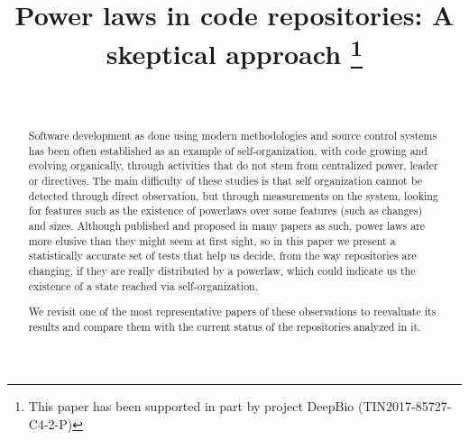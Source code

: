 \documentclass[conference]{IEEEtran}
\begin{document}
\title{Power laws in code repositories: A skeptical approach
  \thanks{ This paper has been supported in part by
    project DeepBio (TIN2017-85727-C4-2-P)}
} %

\author{
\and
{}
\\
}

\maketitle

\begin{abstract}
  
Software development as done using modern methodologies and source
control systems has been often established as an example of
self-organization, with code growing and evolving organically, through
activities that do not stem from centralized power, leader or
directives.  The main difficulty of these studies is that self
organization cannot be detected through direct observation, but
through measurements on the system, looking for features such as the
existence of powerlaws over some features (such as changes) and sizes.
Although published and proposed in many papers as such, power laws are
more elusive than they might seem at first sight, so in this paper we
present a statistically accurate set of tests that help us decide,
from the way repositories are changing, if they are really distributed
by a powerlaw, which could indicate us the existence of a state
reached via self-organization.

We revisit one of the most representative papers of these observations to reevaluate its results and compare them
with the current status of the repositories analyzed in it.




\end{abstract}
\end{document}
